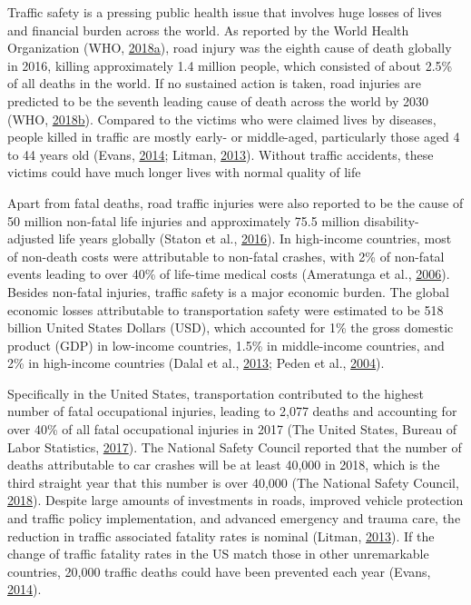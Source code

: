 \documentclass[12pt]{book}
\numberwithin{equation}{chapter}
\begin{document}
Traffic safety is a pressing public health issue that involves huge losses of lives and financial burden across the world. As reported by the World Health Organization (WHO, \protect\hyperlink{ref-who2018}{2018}\protect\hyperlink{ref-who2018}{a}), road injury was the eighth cause of death globally in 2016, killing approximately 1.4 million people, which consisted of about 2.5\% of all deaths in the world. If no sustained action is taken, road injuries are predicted to be the seventh leading cause of death across the world by 2030 (WHO, \protect\hyperlink{ref-who2018b}{2018}\protect\hyperlink{ref-who2018b}{b}). Compared to the victims who were claimed lives by diseases, people killed in traffic are mostly early- or middle-aged, particularly those aged 4 to 44 years old (Evans, \protect\hyperlink{ref-evans2014traffic}{2014}; Litman, \protect\hyperlink{ref-litman2013transportation}{2013}). Without traffic accidents, these victims could have much longer lives with normal quality of life

Apart from fatal deaths, road traffic injuries were also reported to be the cause of 50 million non-fatal life injuries and approximately 75.5 million disability-adjusted life years globally (Staton et al., \protect\hyperlink{ref-staton2016road}{2016}). In high-income countries, most of non-death costs were attributable to non-fatal crashes, with 2\% of non-fatal events leading to over 40\% of life-time medical costs (Ameratunga et al., \protect\hyperlink{ref-ameratunga2006road}{2006}). Besides non-fatal injuries, traffic safety is a major economic burden.
The global economic losses attributable to transportation safety were estimated to be 518 billion United States Dollars (USD), which accounted for 1\% the gross domestic product (GDP) in low-income countries, 1.5\% in middle-income countries, and 2\% in high-income countries (Dalal et al., \protect\hyperlink{ref-dalal2013economics}{2013}; Peden et al., \protect\hyperlink{ref-peden2004world}{2004}).

Specifically in the United States, transportation contributed to the highest number of fatal occupational injuries, leading to 2,077 deaths and accounting for over 40\% of all fatal occupational injuries in 2017 (The United States, Bureau of Labor Statistics, \protect\hyperlink{ref-bols}{2017}). The National Safety Council reported that the number of deaths attributable to car crashes will be at least 40,000 in 2018, which is the third straight year that this number is over 40,000 (The National Safety Council, \protect\hyperlink{ref-nsc2018}{2018}). Despite large amounts of investments in roads, improved vehicle protection and traffic policy implementation, and advanced emergency and trauma care, the reduction in traffic associated fatality rates is nominal (Litman, \protect\hyperlink{ref-litman2013transportation}{2013}). If the change of traffic fatality rates in the US match those in other unremarkable countries, 20,000 traffic deaths could have been prevented each year (Evans, \protect\hyperlink{ref-evans2014traffic}{2014}).
\end{document}
